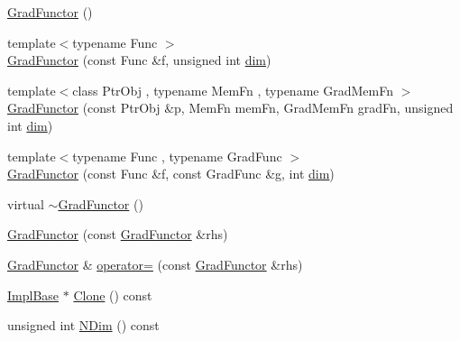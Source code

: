 \begin{DoxyCompactItemize}
\mbox{\hyperlink{classROOT_1_1Math_1_1GradFunctor_a68c75192981688e292ee84be652a8ec4}{Grad\+Functor}} ()
\item 
{\footnotesize template$<$typename Func $>$ }\\\mbox{\hyperlink{classROOT_1_1Math_1_1GradFunctor_a9cdbcd3d49494b4209524b3c5b3172d2}{Grad\+Functor}} (const Func \&f, unsigned int \mbox{\hyperlink{adat__devel_2lib_2hadron_2irrep__util_8cc_a70b5e28b5bc3d1b63a7435c5fe50b837}{dim}})
\item 
{\footnotesize template$<$class Ptr\+Obj , typename Mem\+Fn , typename Grad\+Mem\+Fn $>$ }\\\mbox{\hyperlink{classROOT_1_1Math_1_1GradFunctor_af7c06950b37bea8844b81f53b0bf41df}{Grad\+Functor}} (const Ptr\+Obj \&p, Mem\+Fn mem\+Fn, Grad\+Mem\+Fn grad\+Fn, unsigned int \mbox{\hyperlink{adat__devel_2lib_2hadron_2irrep__util_8cc_a70b5e28b5bc3d1b63a7435c5fe50b837}{dim}})
\item 
{\footnotesize template$<$typename Func , typename Grad\+Func $>$ }\\\mbox{\hyperlink{classROOT_1_1Math_1_1GradFunctor_a079a63821986eb0ce6e011c366c1cb9a}{Grad\+Functor}} (const Func \&f, const Grad\+Func \&g, int \mbox{\hyperlink{adat__devel_2lib_2hadron_2irrep__util_8cc_a70b5e28b5bc3d1b63a7435c5fe50b837}{dim}})
\item 
virtual \mbox{\hyperlink{classROOT_1_1Math_1_1GradFunctor_a1dfc4e8382f679a935eae97c5e7ee4dd}{$\sim$\+Grad\+Functor}} ()
\item 
\mbox{\hyperlink{classROOT_1_1Math_1_1GradFunctor_a629b55d9f326dbf39e5c3ccfb4678579}{Grad\+Functor}} (const \mbox{\hyperlink{classROOT_1_1Math_1_1GradFunctor}{Grad\+Functor}} \&rhs)
\item 
\mbox{\hyperlink{classROOT_1_1Math_1_1GradFunctor}{Grad\+Functor}} \& \mbox{\hyperlink{classROOT_1_1Math_1_1GradFunctor_a7f7a0c6b466d283cb6085f0e57ab1e6a}{operator=}} (const \mbox{\hyperlink{classROOT_1_1Math_1_1GradFunctor}{Grad\+Functor}} \&rhs)
\item 
\mbox{\hyperlink{classROOT_1_1Math_1_1GradFunctor_a1fb9161fc93c7e7fa185dddbcc2c4f4d}{Impl\+Base}} $\ast$ \mbox{\hyperlink{classROOT_1_1Math_1_1GradFunctor_a21093c0d3001069e49ce6278b5a32a40}{Clone}} () const
\item 
unsigned int \mbox{\hyperlink{classROOT_1_1Math_1_1GradFunctor_a7ff4ed4ad6f7c17d74403a443990f069}{N\+Dim}} () const
\end{DoxyCompactItemize}


